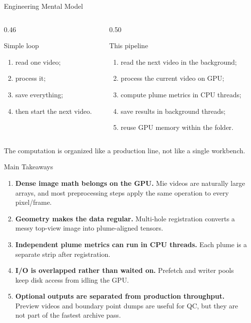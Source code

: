\documentclass[aspectratio=169,11pt]{beamer}
\newcommand{\bluetext}[1]{\textcolor{aaltoBlue}{#1}}
\begin{document}
\begin{frame}{Engineering Mental Model}
\small
\begin{columns}[T,onlytextwidth]
\begin{column}{0.46\linewidth}
\begin{block}{Simple loop}
\begin{enumerate}
  \item read one video;
  \item process it;
  \item save everything;
  \item then start the next video.
\end{enumerate}
\end{block}
\end{column}

\begin{column}{0.50\linewidth}
\begin{block}{This pipeline}
\begin{enumerate}
  \item read the next video in the background;
  \item process the current video on GPU;
  \item compute plume metrics in CPU threads;
  \item save results in background threads;
  \item reuse GPU memory within the folder.
\end{enumerate}
\end{block}
\end{column}
\end{columns}

\vspace{0.7em}
\centering
\Large
\bluetext{The computation is organized like a production line, not like a single workbench.}
\end{frame}

\begin{frame}{Main Takeaways}
\small
\begin{enumerate}
  \item \textbf{Dense image math belongs on the GPU.} Mie videos are naturally large arrays, and most preprocessing steps apply the same operation to every pixel/frame.
  \item \textbf{Geometry makes the data regular.} Multi-hole registration converts a messy top-view image into plume-aligned tensors.
  \item \textbf{Independent plume metrics can run in CPU threads.} Each plume is a separate strip after registration.
  \item \textbf{I/O is overlapped rather than waited on.} Prefetch and writer pools keep disk access from idling the GPU.
  \item \textbf{Optional outputs are separated from production throughput.} Preview videos and boundary point dumps are useful for QC, but they are not part of the fastest archive pass.
\end{enumerate}
\end{frame}
\end{document}
